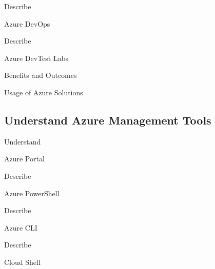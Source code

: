 \documentclass{scrartcl}
\newenvironment{flashcard}[2][]{%
    #1
    \vfill
    \centerline{\Large{#2}}
    \vfill
    \newpage
}
{\newpage}
\newcommand{\subsectioncard}[1]{
    \vspace*{\stretch{1}}
    \subsection{#1}
    \vspace*{\stretch{1}}
    \pagebreak
}
\begin{document}
    \begin{flashcard}[Describe]{Azure DevOps}

    \end{flashcard}

    \begin{flashcard}[Describe]{Azure DevTest Labs}

    \end{flashcard}

    \begin{flashcard}[Benefits and Outcomes]{Usage of Azure Solutions}

    \end{flashcard}

    \subsectioncard{Understand Azure Management Tools}

    \begin{flashcard}[Understand]{Azure Portal}

    \end{flashcard}

    \begin{flashcard}[Describe]{Azure PowerShell}

    \end{flashcard}

    \begin{flashcard}[Describe]{Azure CLI}

    \end{flashcard}

    \begin{flashcard}[Describe]{Cloud Shell}

    \end{flashcard}
\end{document}
